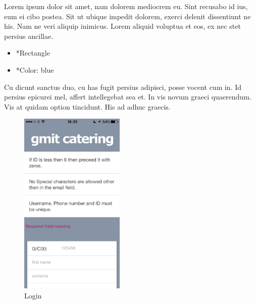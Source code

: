 \begin{minipage}{0.55\textwidth}
	Lorem ipsum dolor sit amet, nam dolorem mediocrem eu. Sint recusabo id ius, eum ei cibo postea. Sit ut ubique impedit dolorem, exerci delenit dissentiunt ne his. Nam ne veri aliquip inimicus. Lorem aliquid voluptua et eos, ex nec stet persius ancillae.
	\begin{itemize}
		\item *Rectangle
		\item *Color: blue
	\end{itemize}
	Cu dicunt sanctus duo, cu has fugit persius adipisci, posse vocent cum in. Id persius epicurei mel, affert intellegebat sea et. In vis novum graeci quaerendum. Vis at quidam option tincidunt. His ad adhuc graecis.
\end{minipage}
\begin{minipage}{5cm}
	\begin{figure}[H]
		\includegraphics[width=5cm]{img/mobile-app/screen-shots/IMG_2906.jpg}
		\caption{Login}
	\end{figure}
\end{minipage} \hfill

